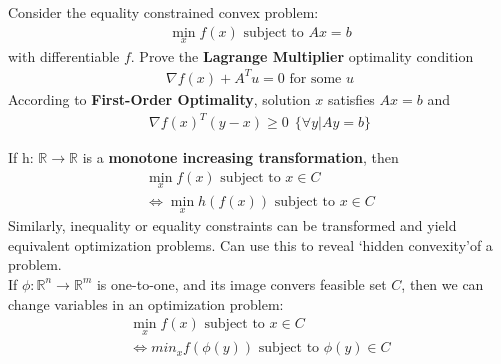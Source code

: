 \documentclass{article}
\begin{document}
\begin{headered_note}
  Consider the equality constrained convex problem:
  \begin{align}
    \min_x f(x) \text{ subject to }Ax=b
  \end{align}
  with differentiable $f$.  Prove the \textbf{Lagrange Multiplier} optimality condition
  \begin{align}
    \nabla f(x)+A^Tu=0\text{ for some }u
  \end{align}
  According to \textbf{First-Order Optimality}, solution $x$ satisfies $Ax=b$ and
  \begin{align}
    \nabla f(x)^T(y-x)\geq 0~~\{\forall y | Ay=b\}
  \end{align}
\end{headered_note}
\begin{headered_note}
  If h: $\mathbb{R}\rightarrow \mathbb{R}$ is a \textbf{monotone increasing transformation}, then
  \begin{align}
    \min_x f(x)\text{ subject to }x\in C\\
    \Longleftrightarrow \min_x h(f(x))\text{ subject to }x\in C
  \end{align}
  Similarly, inequality or equality constraints can be transformed and yield
  equivalent optimization problems.  Can use this to reveal \textquoteleft hidden convexity\textquoteright of a problem.
  \\
  \vpush
  If $\phi:\mathbb{R}^n\rightarrow \mathbb{R}^m$ is one-to-one, and its image convers feasible set $C$,
  then we can change variables in an optimization problem:
  \begin{align}
    \min_x f(x)\text{ subject to }x\in C\\
    \Longleftrightarrow min_x f(\phi (y))\text{ subject to }\phi(y)\in C
  \end{align}
\end{headered_note}
\end{document}
